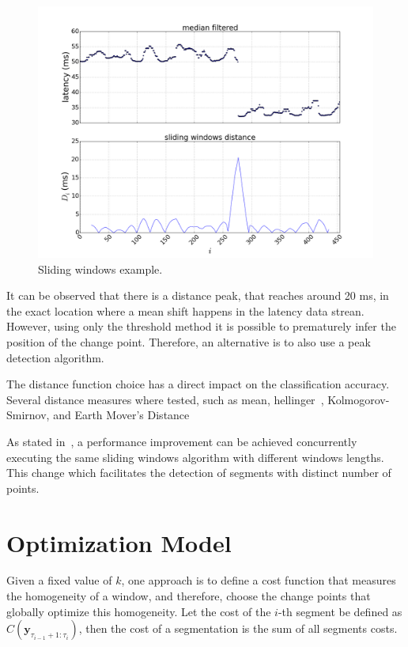 \begin{figure}[H]
    \centering
    \includegraphics[width=1.0\textwidth]{./figures/change_point_detection/sliding_windows/id100_serverNHODTCSRV04_mac64:66:B3:A6:B3:22_dtstart2016-07-01_dtend2016-07-11.png}
    \caption{Sliding windows example.}
\label{fig:sliding_windows_example}
\end{figure}%

It can be observed that there is a distance peak, that reaches around 20 ms,
in the exact location
where a mean shift happens in the latency data strean.
However, using only the threshold method it is
possible to prematurely infer the position of the change point. Therefore, an
alternative is to also use a peak detection algorithm.

The distance
function choice has a direct impact on the classification accuracy. Several
distance measures where tested, such as mean,
hellinger~\cite{hellinger_distance}, Kolmogorov-Smirnov, and
Earth Mover's Distance~\cite{the_earth_movers_distance_as_a_metric_for_image_retrieval}

As stated in~\cite{detecting_change_in_data_streams}, a performance improvement
can be achieved concurrently executing the same sliding windows algorithm with
different windows lengths. This change which facilitates the detection of
segments with distinct number of points.

\section{Optimization Model}

Given a fixed value of $k$, one approach is to define a cost function that
measures the homogeneity of a window, and therefore, choose the change points
that globally optimize this homogeneity. Let the cost of the $i$-th segment be
defined as $C(\mathbf{y}_{\tau_{i - 1} + 1 : \tau_{i}})$, then the cost of a
segmentation is the sum of all segments costs.

